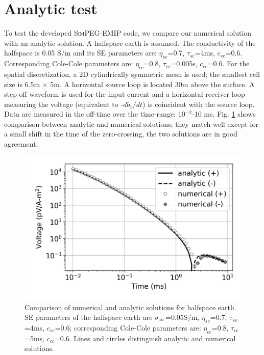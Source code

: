 \section{Analytic test}
\label{app: Analytic test}
To test the developed \textsc{SimPEG-EMIP} code, we compare our numerical solution with an analytic solution. A halfspace earth is assumed. The conductivity of the halfspace is 0.05 S/m and its SE parameters are: $\eta_{se}$=0.7, $\tau_{se}$=4ms, $c_{se}$=0.6. Corresponding Cole-Cole parameters are: $\eta_{cc}$=0.8, $\tau_{cc}$=0.005s, $c_{cc}$=0.6.
For the spatial discretization, a 2D cylindrically symmetric mesh is used; the smallest cell size is 6.5m $\times$ 5m.
A horizontal source loop is located 30m above the surface. A step-off waveform is used for the input current and a horizontal receiver loop measuring the voltage (equivalent to -$db_z/dt$) is coincident with the source loop. Data are measured in the off-time over the time-range: 10$^{-2}$-10 ms.
Fig. \ref{fig:analytic_test} shows comparison between analytic and numerical solutions; they match well except for a small shift in the time of the zero-crossing, the two solutions are in good agreement.

\begin{figure}[htb]
  \centering
  \includegraphics[width=1.0\textwidth]{figures/analytic_test.png}
  \caption{Comparison of numerical and analytic solutions for halfspace earth. SE parameters of the halfspace earth are $\sigma_\infty$=0.05S/m, $\eta_{se}$=0.7, $\tau_{se}$=4ms, $c_{se}$=0.6; corresponding Cole-Cole parameters are: $\eta_{cc}$=0.8, $\tau_{cc}$=5ms, $c_{cc}$=0.6. Lines and circles distinguish analytic and numerical solutions.}
  \label{fig:analytic_test}
\end{figure}
